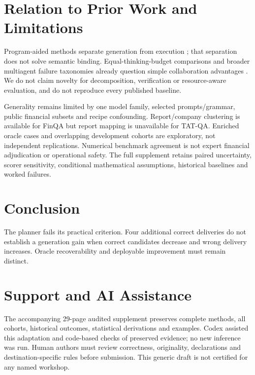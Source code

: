 \documentclass[10pt,twocolumn,letterpaper]{article}
\begin{document}
\section{Relation to Prior Work and Limitations}
Program-aided methods separate generation from execution \citep{pal,pot}; that separation does not solve semantic binding. Equal-thinking-budget comparisons and broader multiagent failure taxonomies already question simple collaboration advantages \citep{equalbudget,mast}. We do not claim novelty for decomposition, verification or resource-aware evaluation, and do not reproduce every published baseline.

Generality remains limited by one model family, selected prompts/grammar, public financial subsets and recipe confounding. Report/company clustering is available for FinQA but report mapping is unavailable for TAT-QA. Enriched oracle cases and overlapping development cohorts are exploratory, not independent replications. Numerical benchmark agreement is not expert financial adjudication or operational safety. The full supplement retains paired uncertainty, scorer sensitivity, conditional mathematical assumptions, historical baselines and worked failures.

\section{Conclusion}
The planner fails its practical criterion. Four additional correct deliveries do not establish a generation gain when correct candidates decrease and wrong delivery increases. Oracle recoverability and deployable improvement must remain distinct.
\section*{Support and AI Assistance}
The accompanying 29-page audited supplement preserves complete methods, all cohorts, historical outcomes, statistical derivations and examples. Codex assisted this adaptation and code-based checks of preserved evidence; no new inference was run. Human authors must review correctness, originality, declarations and destination-specific rules before submission. This generic draft is not certified for any named workshop.

\end{document}
